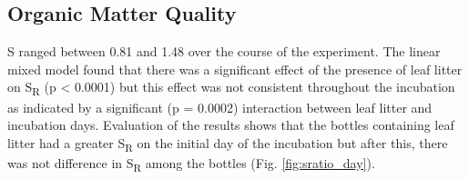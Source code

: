 
\subsection{Organic Matter Quality}

S ranged between 0.81 and 1.48 over the course of the experiment.  The linear mixed model found that there was a significant effect of the presence of leaf litter on S\textsubscript{R} (p < 0.0001) but this effect was not consistent throughout the incubation as indicated by a significant (p = 0.0002) interaction between leaf litter and incubation days. Evaluation of the results shows that the bottles containing leaf litter had a greater S\textsubscript{R} on the initial day of the incubation but after this, there was not difference in S\textsubscript{R} among the bottles (Fig. \ref{fig:sratio_day}).

  